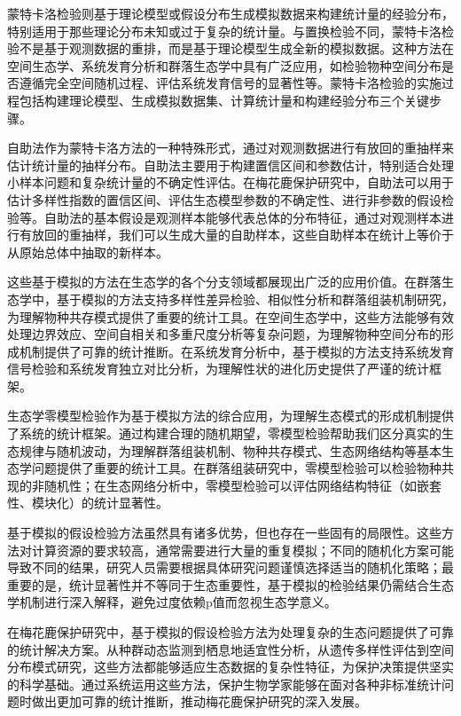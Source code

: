 \documentclass[
  twoside,12pt,fontset=none]{ctexbook}
\begin{document}
蒙特卡洛检验则基于理论模型或假设分布生成模拟数据来构建统计量的经验分布，特别适用于那些理论分布未知或过于复杂的统计量。与置换检验不同，蒙特卡洛检验不是基于观测数据的重排，而是基于理论模型生成全新的模拟数据。这种方法在空间生态学、系统发育分析和群落生态学中具有广泛应用，如检验物种空间分布是否遵循完全空间随机过程、评估系统发育信号的显著性等。蒙特卡洛检验的实施过程包括构建理论模型、生成模拟数据集、计算统计量和构建经验分布三个关键步骤。

自助法作为蒙特卡洛方法的一种特殊形式，通过对观测数据进行有放回的重抽样来估计统计量的抽样分布。自助法主要用于构建置信区间和参数估计，特别适合处理小样本问题和复杂统计量的不确定性评估。在梅花鹿保护研究中，自助法可以用于估计多样性指数的置信区间、评估生态模型参数的不确定性、进行非参数的假设检验等。自助法的基本假设是观测样本能够代表总体的分布特征，通过对观测样本进行有放回的重抽样，我们可以生成大量的自助样本，这些自助样本在统计上等价于从原始总体中抽取的新样本。

这些基于模拟的方法在生态学的各个分支领域都展现出广泛的应用价值。在群落生态学中，基于模拟的方法支持多样性差异检验、相似性分析和群落组装机制研究，为理解物种共存模式提供了重要的统计工具。在空间生态学中，这些方法能够有效处理边界效应、空间自相关和多重尺度分析等复杂问题，为理解物种空间分布的形成机制提供了可靠的统计推断。在系统发育分析中，基于模拟的方法支持系统发育信号检验和系统发育独立对比分析，为理解性状的进化历史提供了严谨的统计框架。

生态学零模型检验作为基于模拟方法的综合应用，为理解生态模式的形成机制提供了系统的统计框架。通过构建合理的随机期望，零模型检验帮助我们区分真实的生态规律与随机波动，为理解群落组装机制、物种共存模式、生态网络结构等基本生态学问题提供了重要的统计工具。在群落组装研究中，零模型检验可以检验物种共现的非随机性；在生态网络分析中，零模型检验可以评估网络结构特征（如嵌套性、模块化）的统计显著性。

基于模拟的假设检验方法虽然具有诸多优势，但也存在一些固有的局限性。这些方法对计算资源的要求较高，通常需要进行大量的重复模拟；不同的随机化方案可能导致不同的结果，研究人员需要根据具体研究问题谨慎选择适当的随机化策略；最重要的是，统计显著性并不等同于生态重要性，基于模拟的检验结果仍需结合生态学机制进行深入解释，避免过度依赖p值而忽视生态学意义。

在梅花鹿保护研究中，基于模拟的假设检验方法为处理复杂的生态问题提供了可靠的统计解决方案。从种群动态监测到栖息地适宜性分析，从遗传多样性评估到空间分布模式研究，这些方法都能够适应生态数据的复杂性特征，为保护决策提供坚实的科学基础。通过系统运用这些方法，保护生物学家能够在面对各种非标准统计问题时做出更加可靠的统计推断，推动梅花鹿保护研究的深入发展。
\end{document}
